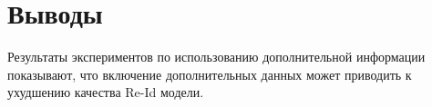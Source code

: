 \chapter{Выводы}
\label{ch:analysis}

Результаты экспериментов по использованию дополнительной информации показывают, что включение дополнительных данных может приводить к ухудшению качества Re-Id модели.